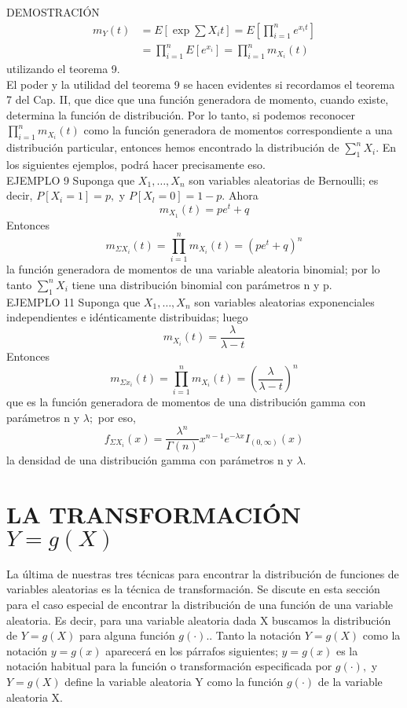 DEMOSTRACIÓN
$$
\begin{aligned}
m_{Y}(t) &=E\left[\exp \sum X_{i} t\right]=E\left[\prod_{i=1}^{n} e^{x_{i} t}\right] \\
&=\prod_{i=1}^{n} E\left[e^{x_{i}}\right]=\prod_{i=1}^{n} m_{X_{i}}(t)
\end{aligned}
$$
utilizando el teorema 9.\\

El poder y la utilidad del teorema 9 se hacen evidentes si recordamos el teorema 7 del Cap. II, que dice que una función generadora de momento, cuando existe, determina la función de distribución. Por lo tanto, si podemos reconocer $\prod_{i=1}^{n} m_{X_{i}}(t)$ como la función generadora de momentos correspondiente a una distribución particular, entonces hemos encontrado la distribución de $\sum_{1}^{n} X_{i} .$ En los siguientes ejemplos, podrá hacer precisamente eso.\\

EJEMPLO 9 Suponga que $X_{1}, \ldots, X_{n}$ son variables aleatorias de Bernoulli; es decir, $P\left[X_{i}=1\right]=p,$ y $P\left[X_{l}=0\right]=1-p .$ Ahora
$$
m_{X_{1}}(t)=p e^{t}+q
$$
Entonces
$$
m_{\Sigma X_{i}}(t)=\prod_{i=1}^{n} m_{X_{i}}(t)=\left(p e^{t}+q\right)^{n}
$$
la función generadora de momentos de una variable aleatoria binomial; por lo tanto $\sum_{1}^{n} X_{i}$ tiene una distribución binomial con parámetros n y p.\\

EJEMPLO 11 Suponga que $X_{1}, \ldots, X_{n}$ son variables aleatorias exponenciales independientes e idénticamente distribuidas; luego
$$
m_{X_{i}}(t)=\frac{\lambda}{\lambda-t}
$$
Entonces
$$
m_{\Sigma x_{i}}(t)=\prod_{i=1}^{n} m_{X_{i}}(t)=\left(\frac{\lambda}{\lambda-t}\right)^{n}
$$
que es la función generadora de momentos de una distribución gamma con parámetros n y $\lambda ;$ por eso,
$$
f_{\Sigma X_{i}}(x)=\frac{\lambda^{n}}{\Gamma(n)} x^{n-1} e^{-\lambda x} I_{(0, \infty)}(x)
$$
la densidad de una distribución gamma con parámetros n y $\lambda$.

\section{LA TRANSFORMACIÓN $Y=g(X)$}

La última de nuestras tres técnicas para encontrar la distribución de funciones de variables aleatorias es la técnica de transformación. Se discute en esta sección para el caso especial de encontrar la distribución de una función de una variable aleatoria. Es decir, para una variable aleatoria dada X buscamos la distribución de $Y=g(X)$ para alguna función $g(\cdot) .$. Tanto la notación $Y=g(X)$ como la notación $y=g(x)$ aparecerá en los párrafos siguientes; $y=g(x)$ es la notación habitual para la función o transformación especificada por $g(\cdot),$ y $Y=g(X)$ define la variable aleatoria Y como la función $g(\cdot)$ de la variable aleatoria X.

